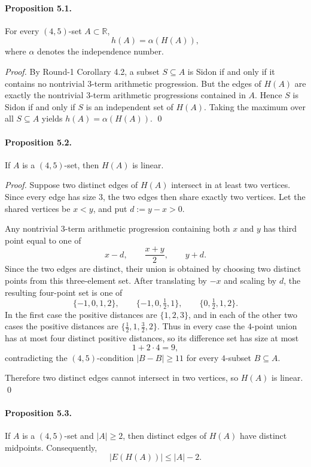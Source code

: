 \paragraph{Proposition 5.1.}
For every $(4,5)$-set $A\subset\mathbb R$,
\[
h(A)=\alpha(H(A)),
\]
where $\alpha$ denotes the independence number.

\emph{Proof.}
By Round-1 Corollary 4.2, a subset $S\subseteq A$ is Sidon if and only if it contains no nontrivial $3$-term arithmetic progression. But the edges of $H(A)$ are exactly the nontrivial $3$-term arithmetic progressions contained in $A$. Hence $S$ is Sidon if and only if $S$ is an independent set of $H(A)$. Taking the maximum over all $S\subseteq A$ yields $h(A)=\alpha(H(A))$. \qed

\paragraph{Proposition 5.2.}
If $A$ is a $(4,5)$-set, then $H(A)$ is linear.

\emph{Proof.}
Suppose two distinct edges of $H(A)$ intersect in at least two vertices. Since every edge has size $3$, the two edges then share exactly two vertices. Let the shared vertices be $x<y$, and put $d:=y-x>0$.

Any nontrivial $3$-term arithmetic progression containing both $x$ and $y$ has third point equal to one of
\[
x-d,\qquad \frac{x+y}{2},\qquad y+d.
\]
Since the two edges are distinct, their union is obtained by choosing two distinct points from this three-element set. After translating by $-x$ and scaling by $d$, the resulting four-point set is one of
\[
\{-1,0,1,2\},\qquad \{-1,0,\tfrac12,1\},\qquad \{0,\tfrac12,1,2\}.
\]
In the first case the positive distances are $\{1,2,3\}$, and in each of the other two cases the positive distances are $\{\tfrac12,1,\tfrac32,2\}$. Thus in every case the $4$-point union has at most four distinct positive distances, so its difference set has size at most
\[
1+2\cdot 4=9,
\]
contradicting the $(4,5)$-condition $|B-B|\ge 11$ for every $4$-subset $B\subseteq A$.

Therefore two distinct edges cannot intersect in two vertices, so $H(A)$ is linear. \qed

\paragraph{Proposition 5.3.}
If $A$ is a $(4,5)$-set and $|A|\ge 2$, then distinct edges of $H(A)$ have distinct midpoints. Consequently,
\[
|E(H(A))|\le |A|-2.
\]

